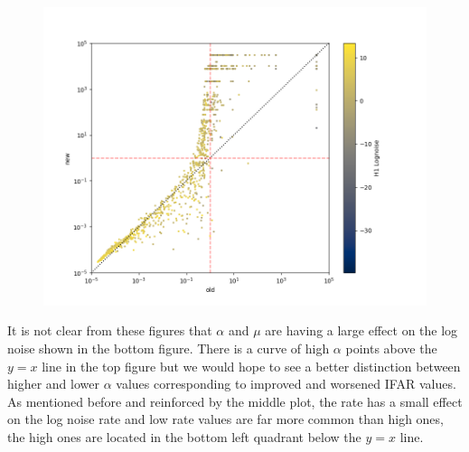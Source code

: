 \begin{figure}
\begin{minipage}[t]{0.8\textwidth}
        \caption{}
        \label{fig:pycbclive-ifar-ifar-h1-rate}
        \vspace{-0.95cm}
        \includegraphics[width=\textwidth]{images/pycbclive/all_full_h1_lognoise.png}
        \caption{}
        \label{fig:pycbclive-ifar-ifar-h1-log-noise-rate}
    \end{minipage}
\end{figure}
%
It is not clear from these figures that $\alpha$ and $\mu$ are having a large effect on the log noise shown in the bottom figure. There is a curve of high $\alpha$ points above the $y=x$ line in the top figure but we would hope to see a better distinction between higher and lower $\alpha$ values corresponding to improved and worsened IFAR values. As mentioned before and reinforced by the middle plot, the rate has a small effect on the log noise rate and low rate values are far more common than high ones, the high ones are located in the bottom left quadrant below the $y=x$ line.

